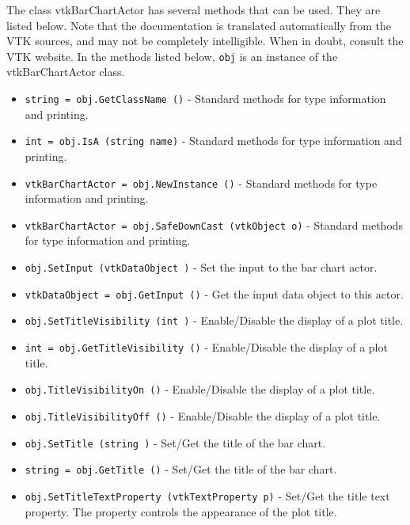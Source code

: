 The class vtkBarChartActor has several methods that can be used.
  They are listed below.
Note that the documentation is translated automatically from the VTK sources,
and may not be completely intelligible.  When in doubt, consult the VTK website.
In the methods listed below, \verb|obj| is an instance of the vtkBarChartActor class.
\begin{itemize}
\item  \verb|string = obj.GetClassName ()| -  Standard methods for type information and printing.

\item  \verb|int = obj.IsA (string name)| -  Standard methods for type information and printing.

\item  \verb|vtkBarChartActor = obj.NewInstance ()| -  Standard methods for type information and printing.

\item  \verb|vtkBarChartActor = obj.SafeDownCast (vtkObject o)| -  Standard methods for type information and printing.

\item  \verb|obj.SetInput (vtkDataObject )| -  Set the input to the bar chart actor.

\item  \verb|vtkDataObject = obj.GetInput ()| -  Get the input data object to this actor.

\item  \verb|obj.SetTitleVisibility (int )| -  Enable/Disable the display of a plot title.

\item  \verb|int = obj.GetTitleVisibility ()| -  Enable/Disable the display of a plot title.

\item  \verb|obj.TitleVisibilityOn ()| -  Enable/Disable the display of a plot title.

\item  \verb|obj.TitleVisibilityOff ()| -  Enable/Disable the display of a plot title.

\item  \verb|obj.SetTitle (string )| -  Set/Get the title of the bar chart.

\item  \verb|string = obj.GetTitle ()| -  Set/Get the title of the bar chart.

\item  \verb|obj.SetTitleTextProperty (vtkTextProperty p)| -  Set/Get the title text property. The property controls the
 appearance of the plot title.


\end{itemize}

